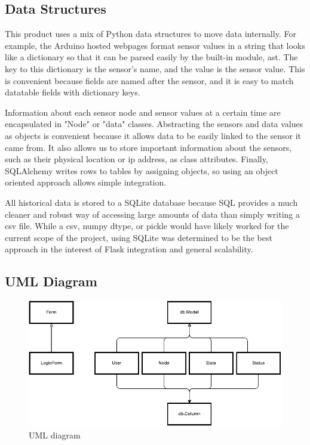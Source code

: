 \documentclass{article}
\begin{document}
\subsection*{Data Structures}
\par This product uses a mix of Python data structures to move data internally. For example, the Arduino hosted webpages format sensor values in a string that looks like a dictionary so that it can be parsed easily by the built-in module, ast.  The key to this dictionary is the sensor's name, and the value is the sensor value. This is convenient because fields are named after the sensor, and it is easy to match datatable fields with dictionary keys.
\par Information about each sensor node and sensor values at a certain time are encapsulated in "Node" or "data" classes.  Abstracting the sensors and data values as objects is convenient because it allows data to be easily linked to the sensor it came from. It also allows us to store important information about the sensors, such as their physical location or ip address, as class attributes. Finally, SQLAlchemy writes rows to tables by assigning objects, so using an object oriented approach allows simple integration.
\par All historical data is stored to a SQLite database because SQL provides a much cleaner and robust way of accessing large amounts of data than simply writing a csv file.  While a csv, numpy dtype, or pickle would have likely worked for the current scope of the project, using SQLite was determined to be the best approach in the interest of Flask integration and general scalability.

\subsection*{UML Diagram}
\FloatBarrier
\begin{figure}[h!]
    \centering
    \includegraphics[scale=0.75]{UML.pdf}
    \caption{UML diagram}
\end{figure}
\FloatBarrier
\end{document}
